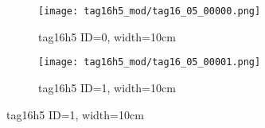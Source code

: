 \documentclass[11pt,a4paper]{article}
\begin{document}


    \begin{figure}
        \centering
        
        \begin{subfigure}[b]{.5\linewidth}
            \texttt{[image: tag16h5\_mod/tag16\_05\_00000.png]}
            \caption*{tag16h5 ID=0, width=10cm}
        \end{subfigure}
        
        \begin{subfigure}[b]{.5\linewidth}
            \texttt{[image: tag16h5\_mod/tag16\_05\_00001.png]}
            \caption*{tag16h5 ID=1, width=10cm}
        \end{subfigure}
        
        
        
    \end{figure}
    
%         
\end{document}
